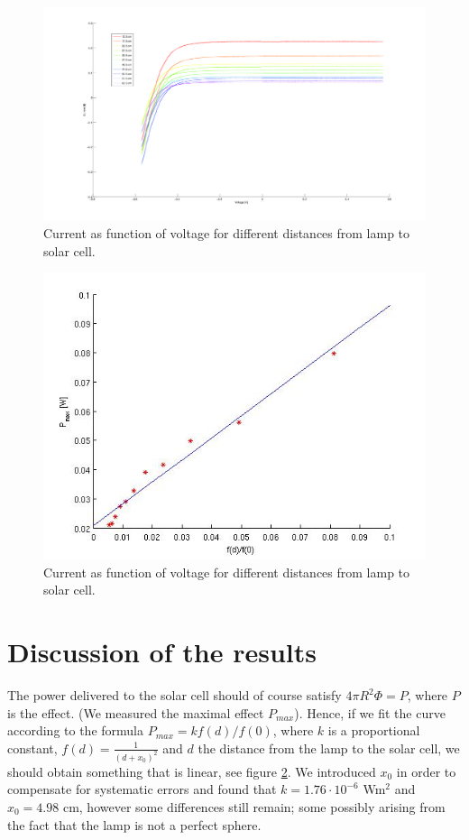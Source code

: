 \documentclass[a4paper]{article}
\begin{document}
\begin{figure}[h!]
  \begin{center}
    \includegraphics[scale=0.3]{IvsU.jpg}
  \end{center}
  \caption{Current as function of voltage for different distances from lamp to solar cell.}
  \label{ivsu}
\end{figure}
\begin{figure}[h!]
  \begin{center}
    \includegraphics[scale=0.3]{pmaxvsf.jpg}
  \end{center}
  \caption{Current as function of voltage for different distances from lamp to solar cell.}
  \label{pmaxvsf}
\end{figure}
\section{Discussion of the results}
The power delivered to the solar cell should of course satisfy $4\pi R^2\Phi = P$, where $P$ is the effect. (We measured the maximal effect $P_{max}$). Hence, if we fit the curve according to the formula $P_{max}=kf(d)/f(0)$, where $k$ is a proportional constant, $f(d)=\frac{1}{(d+x_0)^2}$ and $d$ the distance from the lamp to the solar cell, we should obtain something that is linear, see figure \ref{pmaxvsf}. We introduced $x_0$ in order to compensate for systematic errors and found that $k=1.76\cdot 10^{-6}$ Wm${}^2$ and $x_0=4.98$ cm, however some differences still remain; some possibly arising from the fact that the lamp is not a perfect sphere.
\end{document}
